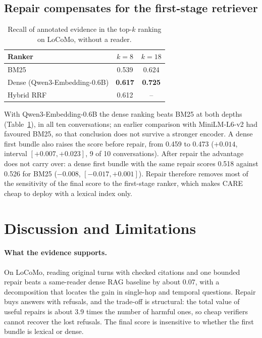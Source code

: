 \documentclass[10pt]{article}
\theoremstyle{plain}
\newcommand{\care}{\textsc{CARE}}
\begin{document}
\subsection{Repair compensates for the first-stage retriever}
\label{sec:retriever}

\begin{table}[t]
\centering
\caption{Recall of annotated evidence in the top-$k$ ranking on LoCoMo, without a reader.}
\label{tab:retrieval}
\small
\begin{tabular}{lcc}
\toprule
Ranker & $k{=}8$ & $k{=}18$ \\
\midrule
BM25 & 0.539 & 0.624 \\
Dense (Qwen3-Embedding-0.6B) & \textbf{0.617} & \textbf{0.725} \\
Hybrid RRF & 0.612 & -- \\
\bottomrule
\end{tabular}
\end{table}

With Qwen3-Embedding-0.6B the dense ranking beats BM25 at both depths (Table~\ref{tab:retrieval}), in all ten
conversations; an earlier comparison with MiniLM-L6-v2 had favoured BM25, so that conclusion does not survive a
stronger encoder. A dense first bundle also raises the score before repair, from 0.459 to 0.473 ($+0.014$, interval
$[+0.007,+0.023]$, 9 of 10 conversations). After repair the advantage does not carry over: a dense first bundle with
the same repair scores 0.518 against 0.526 for BM25 ($-0.008$, $[-0.017,+0.001]$). Repair therefore removes most of the
sensitivity of the final score to the first-stage ranker, which makes \care{} cheap to deploy with a lexical index only.

\section{Discussion and Limitations}
\label{sec:discussion}

\paragraph{What the evidence supports.} On LoCoMo, reading original turns with checked citations and one bounded repair
beats a same-reader dense RAG baseline by about 0.07, with a decomposition that locates the gain in single-hop and
temporal questions. Repair buys answers with refusals, and the trade-off is structural: the total value of useful repairs
is about 3.9 times the number of harmful ones, so cheap verifiers cannot recover the lost refusals. The final score is
insensitive to whether the first bundle is lexical or dense.
\end{document}
